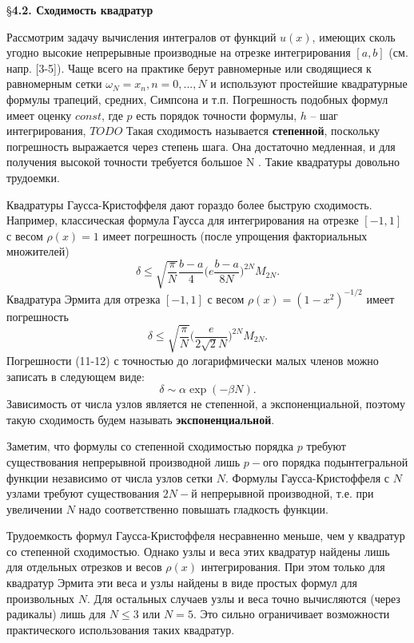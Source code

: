 
\S \textbf{4.2. Сходимость квадратур}

Рассмотрим задачу вычисления интегралов от
функций $u(x)$, имеющих сколь угодно высокие непрерывные производные на
отрезке интегрирования $[a,b]$ (см. напр. [3-5]). Чаще всего на практике берут
равномерные или сводящиеся к равномерным сетки $ \omega_N={x_n,n=0,...,N}$ и
используют простейшие квадратурные формулы трапеций, средних, Симпсона
и т.п. Погрешность подобных формул имеет оценку
$const$, где $p$ есть порядок точности формулы, $h$ – шаг интегрирования, $TODO$ Такая сходимость называется
\textbf{степенной}, поскольку погрешность выражается через степень шага. Она
достаточно медленная, и для получения высокой точности требуется большое N .
Такие квадратуры довольно трудоемки.

Квадратуры Гаусса-Кристоффеля дают гораздо более быструю
сходимость. Например, классическая формула Гаусса для интегрирования на
отрезке $[-1,1]$ с весом $\rho(x)=1$ имеет погрешность (после упрощения
факториальных множителей)
\begin{equation}
\delta  \leqslant \sqrt{\frac{\pi}{N}}\frac{b-a}{4}\Bigg(e\frac{b-a}{8N}\Bigg)^{2N}M_{2N}.
\end{equation}
Квадратура Эрмита для отрезка $[-1,1]$ с весом $\rho(x)=(1-x^2)^{-1/2}$ имеет
погрешность
\begin{equation}
\delta \leqslant \sqrt{\frac{\pi}{N}}\Bigg(\frac{e}{2\sqrt{2}N}\Bigg)^{2N}M_{2N}.
\end{equation}
Погрешности (11-12) с точностью до логарифмически малых членов можно
записать в следующем виде:
\begin{equation}
\delta \sim \alpha \exp{(-\beta N)}.
\end{equation}
Зависимость от числа узлов является не степенной, а экспоненциальной,
поэтому такую сходимость будем называть \textbf{экспоненциальной}.

Заметим, что формулы со степенной сходимостью порядка $p$ требуют существования непрерывной производной лишь $p-$ого порядка подынтегральной функции независимо от числа узлов сетки $N$. Формулы Гаусса-Кристоффеля с $N$ узлами требуют существования $2N-$й непрерывной производной, т.е. при увеличении $N$ надо соответственно повышать гладкость функции.

Трудоемкость формул Гаусса-Кристоффеля несравненно меньше, чем у квадратур со
степенной сходимостью. Однако узлы и веса этих квадратур
найдены лишь для отдельных отрезков и весов $\rho(x)$ интегрирования. При этом
только для квадратур Эрмита эти веса и узлы найдены в виде простых формул
для произвольных $N$. Для остальных случаев узлы и веса точно вычисляются
(через радикалы) лишь для $N \leqslant 3$ или $N = 5$. Это сильно ограничивает
возможности практического использования таких квадратур.

